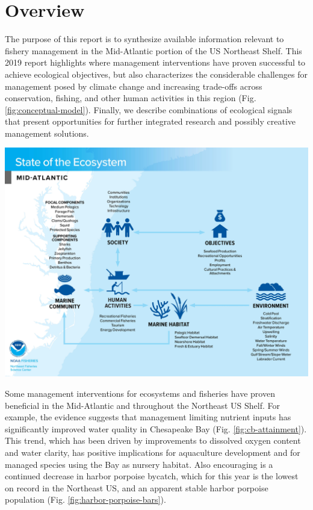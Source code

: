 \documentclass[10pt,]{article}
\title{}
\author{}
\date{}
\let\origfigure\figure
\let\endorigfigure\endfigure
\renewenvironment{figure}[1][2] {
    \expandafter\origfigure\expandafter[H]
} {
    \endorigfigure
}
\begin{document}
\section{Overview}\label{overview}

The purpose of this report is to synthesize available information
relevant to fishery management in the Mid-Atlantic portion of the US
Northeast Shelf. This 2019 report highlights where management
interventions have proven successful to achieve ecological objectives,
but also characterizes the considerable challenges for management posed
by climate change and increasing trade-offs across conservation,
fishing, and other human activities in this region (Fig.
\ref{fig:conceptual-model}). Finally, we describe combinations of
ecological signals that present opportunities for further integrated
research and possibly creative management solutions.

\begin{figure}

{\centering \includegraphics[width=\textwidth]{images/MAB_conmod_overview} 

}

\caption{A conceptual model places detailed species-level management in context by highlighting relationships between focal species groups organized by the Mid-Atlantic Fisheries Management Council (MAFMC) Fishery Management Plan (FMP), managed human activities, environmental drivers, habitats, and key ecological links.}\label{fig:conceptual-model}
\end{figure}

Some management interventions for ecosystems and fisheries have proven
beneficial in the Mid-Atlantic and throughout the Northeast US Shelf.
For example, the evidence suggests that management limiting nutrient
inputs has significantly improved water quality in Chesapeake Bay (Fig.
\ref{fig:cb-attainment}). This trend, which has been driven by
improvements to dissolved oxygen content and water clarity, has positive
implications for aquaculture development and for managed species using
the Bay as nursery habitat. Also encouraging is a continued decrease in
harbor porpoise bycatch, which for this year is the lowest on record in
the Northeast US, and an apparent stable harbor porpoise population
(Fig. \ref{fig:harbor-porpoise-bars}).
\end{document}
